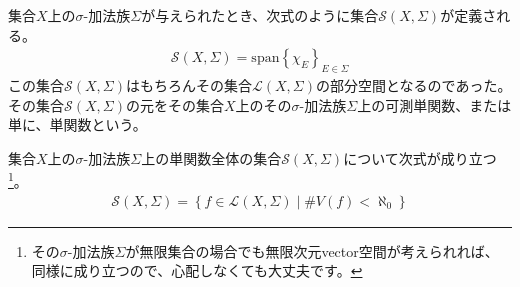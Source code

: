 \documentclass[dvipdfmx]{jsarticle}
\begin{document}
\begin{dfn}
集合$X$上の$\sigma$-加法族$\varSigma$が与えられたとき、次式のように集合$\mathcal{S}(X,\varSigma)$が定義される。
\begin{align*}
\mathcal{S}(X,\varSigma) = \mathrm{span}\left\{ \chi_{E} \right\}_{E \in \varSigma}
\end{align*}
この集合$\mathcal{S}(X,\varSigma)$はもちろんその集合$\mathcal{L}(X,\varSigma)$の部分空間となるのであった。その集合$\mathcal{S}(X,\varSigma)$の元をその集合$X$上のその$\sigma$-加法族$\varSigma$上の可測単関数、または単に、単関数という。
\end{dfn}
\begin{thm}\label{4.5.5.17}
集合$X$上の$\sigma$-加法族$\varSigma$上の単関数全体の集合$\mathcal{S}(X,\varSigma)$について次式が成り立つ\footnote{その$\sigma$-加法族$\varSigma$が無限集合の場合でも無限次元vector空間が考えられれば、同様に成り立つので、心配しなくても大丈夫です。}。
\begin{align*}
\mathcal{S}(X,\varSigma) = \left\{ f\in \mathcal{L}(X,\varSigma) \middle| \#{V(f)} < \aleph_{0} \right\}
\end{align*}
\end{thm}
\end{document}
